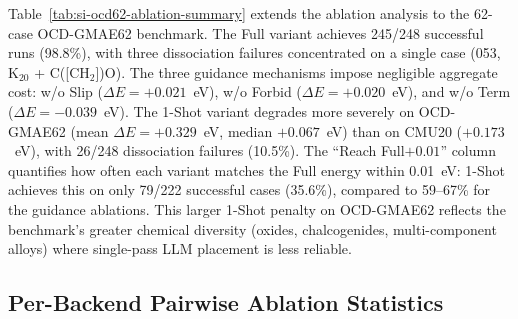 \documentclass[%
 preprint,
 superscriptaddress,
 amsmath,amssymb,
 aps,
 prb,
 floatfix,
]{revtex4-2}
\begin{document}
Table~\ref{tab:si-ocd62-ablation-summary} extends the ablation analysis to the 62-case OCD-GMAE62 benchmark. The Full variant achieves 245/248 successful runs (98.8\%), with three dissociation failures concentrated on a single case (053, K$_{20}$ + C([CH$_2$])O). The three guidance mechanisms impose negligible aggregate cost: w/o Slip ($\Delta E = +0.021$~eV), w/o Forbid ($\Delta E = +0.020$~eV), and w/o Term ($\Delta E = -0.039$~eV). The 1-Shot variant degrades more severely on OCD-GMAE62 (mean $\Delta E = +0.329$~eV, median $+0.067$~eV) than on CMU20 ($+0.173$~eV), with 26/248 dissociation failures (10.5\%). The ``Reach Full$+0.01$'' column quantifies how often each variant matches the Full energy within 0.01~eV: 1-Shot achieves this on only 79/222 successful cases (35.6\%), compared to 59--67\% for the guidance ablations. This larger 1-Shot penalty on OCD-GMAE62 reflects the benchmark's greater chemical diversity (oxides, chalcogenides, multi-component alloys) where single-pass LLM placement is less reliable.

\subsection{Per-Backend Pairwise Ablation Statistics}
\end{document}
